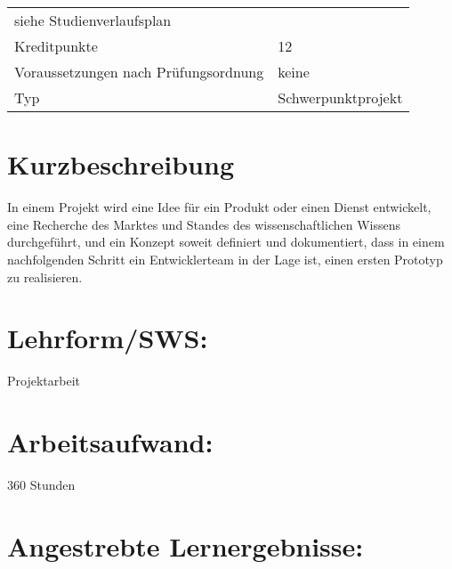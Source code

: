 \begin{longtable}[]{@{}ll@{}}
\begin{minipage}[t]{0.12\columnwidth}
siehe Studienverlaufsplan\strut
\end{minipage}\tabularnewline
\begin{minipage}[t]{0.12\columnwidth}\raggedright\strut
Kreditpunkte\strut
\end{minipage} & \begin{minipage}[t]{0.12\columnwidth}\raggedright\strut
12\strut
\end{minipage}\tabularnewline
\begin{minipage}[t]{0.12\columnwidth}\raggedright\strut
Voraussetzungen nach Prüfungsordnung\strut
\end{minipage} & \begin{minipage}[t]{0.12\columnwidth}\raggedright\strut
keine\strut
\end{minipage}\tabularnewline
\begin{minipage}[t]{0.12\columnwidth}\raggedright\strut
Typ\strut
\end{minipage} & \begin{minipage}[t]{0.12\columnwidth}\raggedright\strut
Schwerpunktprojekt\strut
\end{minipage}\tabularnewline
\bottomrule
\end{longtable}

\section*{Kurzbeschreibung}\label{kurzbeschreibung-10}

In einem Projekt wird eine Idee für ein Produkt oder einen Dienst
entwickelt, eine Recherche des Marktes und Standes des
wissenschaftlichen Wissens durchgeführt, und ein Konzept soweit
definiert und dokumentiert, dass in einem nachfolgenden Schritt ein
Entwicklerteam in der Lage ist, einen ersten Prototyp zu realisieren.

\section*{Lehrform/SWS:}\label{lehrformsws-16}

Projektarbeit

\section*{Arbeitsaufwand:}\label{arbeitsaufwand-16}

360 Stunden

\section*{Angestrebte
Lernergebnisse:}\label{angestrebte-lernergebnisse-16}

